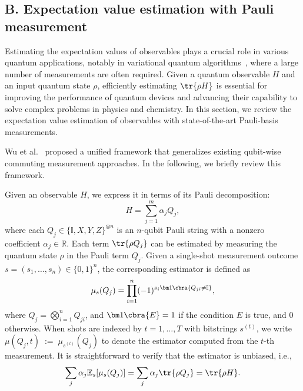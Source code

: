 \documentclass[prl,aps,notitlepage,superscriptaddress,showpacs,nofootinbib]{revtex4-2}
\begin{document}
\subsection{B. Expectation value estimation with Pauli measurement}

Estimating the expectation values of observables plays a crucial role in various quantum applications, notably in variational quantum algorithms~\cite{Cao2019Quantum,cerezo2020variational,endo2020variational}, where a large number of measurements are often required. Given a quantum observable $H$ and an input quantum state $\rho$, efficiently estimating $\tr{\rho H}$ is essential for improving the performance of quantum devices and advancing their capability to solve complex problems in physics and chemistry. In this section, we review the expectation value estimation of observables with state-of-the-art Pauli-basis measurements.

Wu et al.~\cite{wu2023overlapped} proposed a unified framework that generalizes existing qubit-wise commuting measurement approaches. In the following, we briefly review this framework.

Given an observable $H$, we express it in terms of its Pauli decomposition:
\begin{equation}
    H = \sum_{j=1}^m \alpha_j Q_j,
\end{equation}
where each $Q_j \in \{\mathbb{I}, X, Y, Z\}^{\otimes n}$ is an $n$-qubit Pauli string with a nonzero coefficient $\alpha_j\in \mathbb{R}$.
Each term $\tr{\rho Q_j}$ can be estimated by measuring the quantum state $\rho$ in the Pauli term $Q_j$. 
Given a single-shot measurement outcome $s=(s_1,\ldots,s_n)\in\{0,1\}^n$, the corresponding estimator is defined as
\begin{equation}
    \mu_s(Q_j) = \prod_{i=1}^n (-1)^{s_i\bm 1\cbra{Q_{ji} \ne \mathbb{I}}},
\end{equation}
where $Q_j = \bigotimes_{i=1}^n Q_{ji}$, and $\bm 1\cbra{E} = 1$ if the condition $E$ is true, and $0$ otherwise. 
When shots are indexed by $t=1,\ldots,T$ with bitstrings $s^{(t)}$, we write
$\mu(Q_j,t)\;:=\;\mu_{s^{(t)}}(Q_j)$
to denote the estimator computed from the $t$-th measurement. It is straightforward to verify that the estimator is unbiased, i.e.,
\begin{equation}
    \sum_{j}\alpha_j\mathbb{E}_s[\mu_s(Q_j)] = \sum_j\alpha_j \tr{\rho Q_j} = \tr{\rho H}.
\end{equation}
\end{document}
